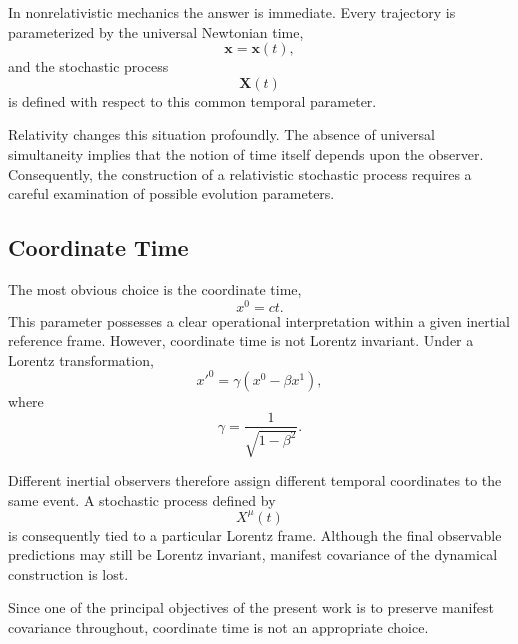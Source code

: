 In nonrelativistic mechanics the answer is immediate. Every trajectory
is parameterized by the universal Newtonian time,
\[\mathbf{x}=\mathbf{x}(t),\]
and the stochastic process
\[\mathbf{X}(t)\]
is defined with respect to this common temporal parameter.

Relativity changes this situation profoundly. The absence of universal
simultaneity implies that the notion of time itself depends upon the
observer. Consequently, the construction of a relativistic stochastic
process requires a careful examination of possible evolution
parameters.

\subsection{Coordinate Time}
The most obvious choice is the coordinate time,
\[x^0=ct.\]
This parameter possesses a clear operational interpretation within a
given inertial reference frame.
However, coordinate time is not Lorentz invariant.
Under a Lorentz transformation,
\[x'^0=\gamma\left(x^0-\beta x^1\right),\]
where
\[\gamma=\frac{1}{\sqrt{1-\beta^2}}.\]

Different inertial observers therefore assign different temporal
coordinates to the same event.
A stochastic process defined by
\[X^\mu(t)\]
is consequently tied to a particular Lorentz frame. Although the final
observable predictions may still be Lorentz invariant, manifest
covariance of the dynamical construction is lost.

Since one of the principal objectives of the present work is to preserve
manifest covariance throughout, coordinate time is not an appropriate
choice.

